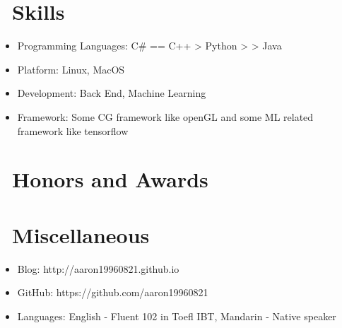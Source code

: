 \documentclass{resume}
\begin{document}
\section{\faCogs\ Skills}
\begin{itemize}[parsep=0.5ex]
  \item Programming Languages: C\# == C++ > Python > > Java
  \item Platform: Linux, MacOS
  \item Development: Back End, Machine Learning
	\item Framework: Some CG framework like openGL and some ML related framework like tensorflow
\end{itemize}

\section{\faHeartO\ Honors and Awards}

\section{\faInfo\ Miscellaneous}
\begin{itemize}[parsep=0.5ex]
  \item Blog: http://aaron19960821.github.io
  \item GitHub: https://github.com/aaron19960821
  \item Languages: English - Fluent 102 in Toefl IBT, Mandarin - Native speaker
\end{itemize}
\end{document}
